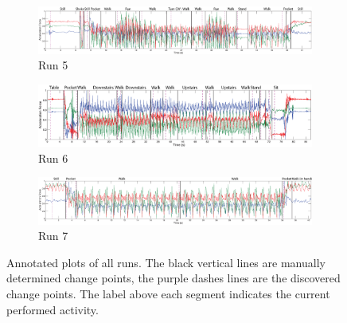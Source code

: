 \begin{figure}
  \begin{subfigure}{1\textwidth}
    \includegraphics[width=\textwidth]{./Figures/chapter6/data_collection/run-6-walk-run-roemer/data_plot_acc_with_discovered_cps.eps}
    \caption{Run 5}
    \label{fig:data_with_cps_run_5}
  \end{subfigure}

  \begin{subfigure}{1\textwidth}
    \includegraphics[width=\textwidth]{./Figures/chapter6/data_collection/stairs-1-marc/data_plot_acc_with_discovered_cps.eps}
    \caption{Run 6}
    \label{fig:data_with_cps_run_6}
  \end{subfigure}

  \begin{subfigure}{1\textwidth}
    \includegraphics[width=\textwidth]{./Figures/chapter6/data_collection/run-3-walk-turn-roemer/data_plot_acc_with_discovered_cps.eps}
    \caption{Run 7}
    \label{fig:data_with_cps_run_7}
  \end{subfigure}

  \caption[Results run 1/8]{Annotated plots of all runs. The black vertical lines are manually determined change points, the purple dashes lines are the discovered change points. The label above each segment indicates the current performed activity.}\label{fig:plots_all_runs_results}
\end{figure}